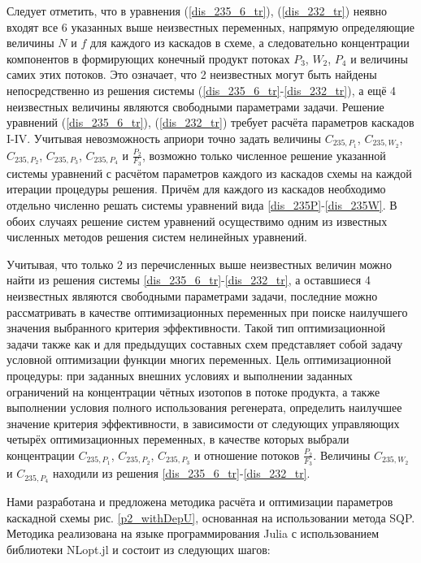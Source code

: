 Следует отметить, что в уравнения (\ref{dis_235_6_tr}), (\ref{dis_232_tr}) неявно входят все 6 указанных выше неизвестных переменных, напрямую определяющие величины $N$ и $f$ для каждого из каскадов в схеме, а следовательно концентрации компонентов в формирующих конечный продукт потоках $P_3$, $W_2$, $P_4$ и величины самих этих потоков. Это означает, что 2 неизвестных могут быть найдены непосредственно из решения системы (\ref{dis_235_6_tr}-\ref{dis_232_tr}), а ещё 4 неизвестных величины являются свободными параметрами задачи. Решение уравнений (\ref{dis_235_6_tr}), (\ref{dis_232_tr}) требует расчёта параметров каскадов I-IV. Учитывая невозможность априори точно задать величины $C_{235,{P_1}}$, $C_{235,{W_2}}$, $C_{235,{P_2}}$, $C_{235,{P_3}}$, $C_{235,{P_4}}$ и $\frac{P_{2}}{F_3}$, возможно только численное решение указанной системы уравнений с расчётом параметров каждого из каскадов схемы на каждой итерации процедуры решения. Причём для каждого из каскадов необходимо отдельно численно решать системы уравнений вида \ref{dis_235P}-\ref{dis_235W}. В обоих случаях решение систем уравнений осуществимо одним из известных численных методов решения систем нелинейных уравнений. 

Учитывая, что только 2 из перечисленных выше неизвестных величин можно найти из решения системы \ref{dis_235_6_tr}-\ref{dis_232_tr}, а оставшиеся 4 неизвестных являются свободными параметрами задачи, последние можно рассматривать в качестве оптимизационных переменных при поиске наилучшего значения выбранного критерия эффективности. Такой тип оптимизационной задачи также как и для предыдущих составных схем представляет собой задачу условной оптимизации функции многих переменных. Цель оптимизационной процедуры: при заданных внешних условиях и выполнении заданных ограничений на концентрации чётных изотопов в потоке продукта, а также выполнении условия полного использования регенерата, определить наилучшее значение критерия эффективности, в зависимости от следующих управляющих четырёх оптимизационных переменных, в качестве которых выбрали концентрации $C_{235,{P_1}}$, $C_{235,{P_2}}$, $C_{235,{P_3}}$ и отношение потоков $\frac{P_{2}}{F_3}$. Величины $C_{235,{W_2}}$ и $C_{235,{P_4}}$ находили из решения \ref{dis_235_6_tr}-\ref{dis_232_tr}. 

Нами разработана и предложена методика расчёта и оптимизации параметров каскадной схемы рис. \ref{p2_withDepU}, основанная на использовании метода SQP.
Методика реализована на языке программирования Julia с использованием библиотеки NLopt.jl \cite{NLopt} и состоит из следующих шагов:

